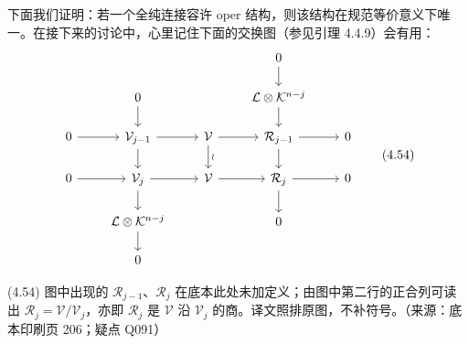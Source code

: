 下面我们证明：若一个全纯连接容许 oper 结构，则该结构在规范等价意义下唯一。在接下来的讨论中，心里记住下面的交换图（参见引理 4.4.9）会有用：
\begin{equation}
\begin{tikzcd}[row sep=1.55em, column sep=2.2em]
 & & & 0 \arrow[d] & \\
 & 0 \arrow[d] & & \mathcal{L}\otimes\mathcal{K}^{n-j} \arrow[d] & \\
 0 \arrow[r] & \mathcal{V}_{j-1} \arrow[r] \arrow[d] & \mathcal{V} \arrow[r] \arrow[d, "\wr"] & \mathcal{R}_{j-1} \arrow[r] \arrow[d] & 0 \\
 0 \arrow[r] & \mathcal{V}_{j} \arrow[r] \arrow[d] & \mathcal{V} \arrow[r] & \mathcal{R}_{j} \arrow[r] \arrow[d] & 0 \\
 & \mathcal{L}\otimes\mathcal{K}^{n-j} \arrow[d] & & 0 & \\
 & 0 & & &
\end{tikzcd}
\tag{4.54}\label{eq:4.54}
\end{equation}
\begin{annote}(4.54) 图中出现的 $\mathcal{R}_{j-1}$、$\mathcal{R}_j$ 在底本此处未加定义；由图中第二行的正合列可读出 $\mathcal{R}_j=\mathcal{V}/\mathcal{V}_j$，亦即 $\mathcal{R}_j$ 是 $\mathcal{V}$ 沿 $\mathcal{V}_j$ 的商。译文照排原图，不补符号。（来源：底本印刷页 206；疑点 Q091）\end{annote}

